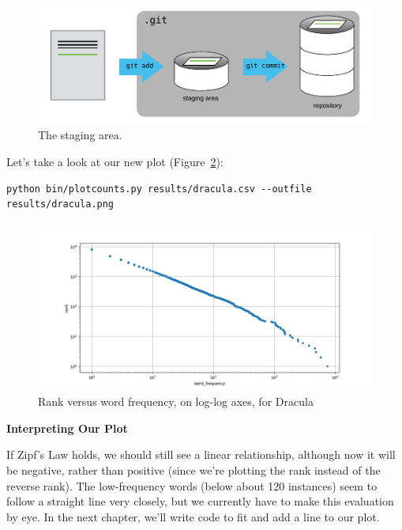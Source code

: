 \documentclass[
]{krantz}
\renewenvironment{quote}{\begin{VF}}{\end{VF}}
\begin{document}
\begin{figure}

{\centering \includegraphics[width=1\linewidth]{figures/git-cmdline/staging-area} 

}

\caption{The staging area.}\label{fig:git-cmdline-staging-area}
\end{figure}

Let's take a look at our new plot (Figure~\ref{fig:git-cmdline-loglog-plot}):

\begin{verbatim}
python bin/plotcounts.py results/dracula.csv --outfile results/dracula.png
\end{verbatim}

\begin{figure}

{\centering \includegraphics[width=1\linewidth]{figures/git-cmdline/plot-loglog} 

}

\caption{Rank versus word frequency, on log-log axes, for Dracula}\label{fig:git-cmdline-loglog-plot}
\end{figure}

\begin{quote}
\textbf{Interpreting Our Plot}

If Zipf's Law holds,
we should still see a linear relationship,
although now it will be negative, rather than positive
(since we're plotting the rank instead of the reverse rank).
The low-frequency words (below about 120 instances)
seem to follow a straight line very closely,
but we currently have to make this evaluation by eye.
In the next chapter,
we'll write code to fit and add a line to our plot.
\end{quote}
\end{document}
